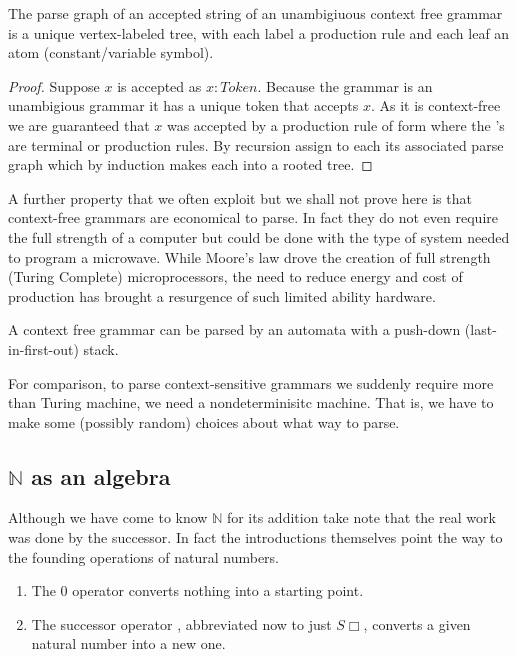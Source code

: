 \begin{proposition}
    The parse graph of an accepted string of an unambigiuous context free grammar 
    is a unique vertex-labeled tree, with each label a production rule and each leaf 
    an atom (constant/variable symbol).
\end{proposition}
\begin{proof}
    Suppose $x$ is accepted as $x:Token$.  
    Because the grammar is an unambigious grammar 
    it has a unique token that accepts $x$.
    As it is context-free we are guaranteed 
    that $x$ was accepted by a production rule of form 
     where the 
    's are 
    terminal or production rules.  By recursion assign 
    to each  its associated parse graph which
     by induction makes each into a rooted tree.
\end{proof}

A further property that we often exploit but we shall not prove here is that 
context-free grammars are economical to parse.  In fact they do not even 
require the full strength of a computer but could be done with the type 
of system needed to program a microwave.  While Moore's law drove the creation 
of full strength (Turing Complete) microprocessors, the need to reduce energy 
and cost of production has brought a resurgence of such limited ability 
hardware.  
\begin{proposition}
    A context free grammar can be parsed by an automata with a push-down (last-in-first-out)
    stack.
\end{proposition}

For comparison, to parse context-sensitive grammars we suddenly require more 
than Turing machine, we need a nondeterminisitc machine.  That is, we have to make 
some (possibly random) choices about what way to parse.

\subsection{$\mathbb{N}$ as an algebra}
Although we have come to know $\mathbb{N}$ for its addition take note that 
the real work was done by the successor.  In fact the introductions themselves 
point the way to the founding operations of natural numbers.
\begin{enumerate}
    \item The $0$ operator converts nothing into a starting point.  
    \item The successor operator , abbreviated now to just 
    $S\Box$, converts a given natural number into a new one.
\end{enumerate}

